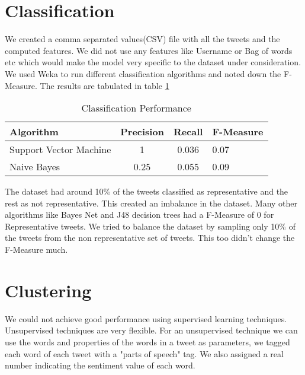 \section{Classification}
We created a comma separated values(CSV) file with all the tweets and the computed features. We did not use any features like Username or Bag of words etc which would make the model very specific to the dataset under consideration. We used Weka to run different classification algorithms and noted down the F-Measure. The results are tabulated in table \ref{tab:one}


\begin{table}
\caption{Classification Performance}
\label{tab:one}
\begin{center}
\begin{tabular}{lccl}
\toprule
Algorithm & Precision & Recall & F-Measure\\
\midrule
Support Vector Machine & 1 & 0.036 & 0.07\\
Naive  Bayes  & 0.25 & 0.055 & 0.09\\
\bottomrule
\end{tabular}
\end{center}
\end{table}


The dataset had around 10\% of the tweets classified as representative and the rest as not representative. This created an imbalance in the dataset. Many other algorithms like Bayes Net and J48 decision trees had a F-Measure of 0 for Representative tweets. We tried to balance the dataset by sampling only 10\% of the tweets from the non representative set of tweets. This too didn't change the F-Measure much. 

\section{Clustering}
We could not achieve good performance using supervised learning techniques. Unsupervised techniques are very flexible. For an unsupervised technique we can use the words and properties of the words in a tweet as parameters, we tagged each word of each tweet with a "parts of speech" tag. We also assigned a real number indicating the sentiment value of each word. 

